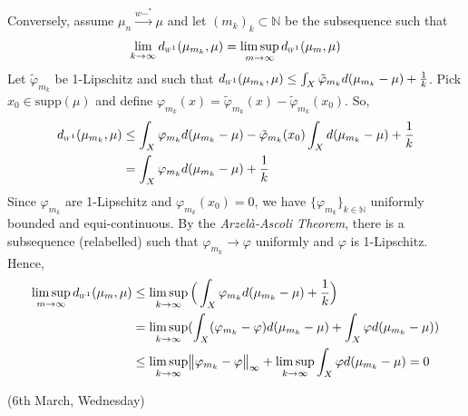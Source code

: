 \documentclass[12pt,a4paper]{article}
\newenvironment{proof}
{\begin{changemargin}{1cm}{0.5cm} 
	}%
	{\end{changemargin}
}
\newenvironment{p}
{\begin{proof} 
	}%
	{\end{proof}
}
\begin{document}
\begin{p}
Conversely, assume $\mu_n \xrightarrow{w-^*} \mu$ and let $(m_k)_k \subset \mathbb{N}$ be the subsequence such that
\begin{align*}
\lim_{k\rightarrow \infty} \wa{1}(\mu_{m_k}, \mu) = \limsup_{m\rightarrow \infty} \wa{1}(\mu_m, \mu)
\end{align*}
Let $\tilde{\varphi}_{m_k}$ be 1-Lipschitz and such that $\wa{1}(\mu_{m_k}, \mu) \leq \int_X \tilde{\varphi}_{m_k} d(\mu_{m_k} - \mu) + \frac{1}{k}$. Pick $x_0 \in \text{supp}(\mu)$ and define $\varphi_{m_k}(x) = \tilde{\varphi}_{m_k}(x) - \tilde{\varphi}_{m_k}(x_0)$. So, 
\begin{align*}
\wa{1}(\mu_{m_k}, \mu) &\leq \int_X \varphi_{m_k} d(\mu_{m_k} - \mu) - \tilde{\varphi}_{m_k}(x_0) \int_X d(\mu_{m_k} - \mu) + \frac{1}{k} \\
&= \int_X \varphi_{m_k} d(\mu_{m_k} - \mu) + \frac{1}{k}
\end{align*}
Since $\varphi_{m_k}$ are 1-Lipschitz and $\varphi_{m_k}(x_0) =0$, we have $\{\varphi_{m_k}\}_{k\in \mathbb{N}}$ uniformly bounded and equi-continuous. By the \emph{Arzel\`a-Ascoli Theorem}, there is a subsequence (relabelled) such that $\varphi_{m_k} \rightarrow \varphi$ uniformly and $\varphi$ is 1-Lipschitz. Hence,
\begin{align*}
\limsup_{m\rightarrow \infty} \wa{1}(\mu_m, \mu) & \leq \limsup_{k\rightarrow \infty} \Big( \int_X \varphi_{m_k}d(\mu_{m_k} - \mu) + \frac{1}{k} \Big) \\
& =\limsup_{k\rightarrow \infty} ( \int_X (\varphi_{m_k} - \varphi) d(\mu_{m_k} - \mu) + \int_X \varphi d(\mu_{m_k} - \mu)) \\
& \leq \limsup_{k\rightarrow \infty} \norms{\varphi_{m_k} - \varphi}{\infty} + \limsup_{k\rightarrow \infty} \int_X \varphi d(\mu_{m_k} - \mu) = 0
\end{align*}
\eop
\end{p}
\s

\newday

(6th March, Wednesday)
\s
\end{document}
